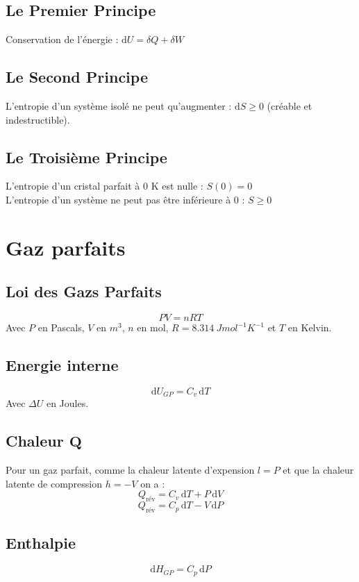 \documentclass[a4paper,12pt]{article}
\newcommand{\diff}{\mathrm{d}} %
\begin{document}
    \begin{multicols}{2}

        \subsection*{Le Premier Principe}
        Conservation de l'énergie : $\boxed{\diff U = \delta Q + \delta W}$

        \subsection*{Le Second Principe}
        L'entropie d'un système isolé ne peut qu'augmenter : $\boxed{\diff S \geq 0}$ (créable et indestructible).

        \subsection*{Le Troisième Principe}
        L'entropie d'un cristal parfait à 0 K est nulle : $\boxed{S(0) = 0}$\\
        L'entropie d'un système ne peut pas être inférieure à 0 : $\boxed{S \geq 0}$

    \end{multicols}



\section{Gaz parfaits}

    \begin{multicols}{2}
        
        \subsection*{Loi des Gazs Parfaits}
            $$ \boxed{PV = nRT} $$
            Avec $P$ en Pascals, $V$ en $m^3$, $n$ en mol, $ R=\qty{8.314}{J mol^{-1} K^{-1}} $ et $T$ en Kelvin. 
        
        \subsection*{Energie interne}
            $$ \boxed{ \diff U_{GP} = C_v \, \diff T } $$
            Avec $\Delta U$ en Joules.

        \subsection*{Chaleur $\bm{Q}$}
            Pour un gaz parfait, comme la chaleur latente d'expension $l=P$ et que la chaleur latente de compression $h=-V$ on a :
                $$ \boxed{ Q_{\text{rév}} = C_v \, \diff T + P \, \diff V } $$
                $$ \boxed{ Q_{\text{rév}} = C_p \, \diff T - V \, \diff P } $$

        \subsection*{Enthalpie}
            $$ \boxed{ \diff H_{GP} = C_p \, \diff P } $$

    \end{multicols}
\end{document}
